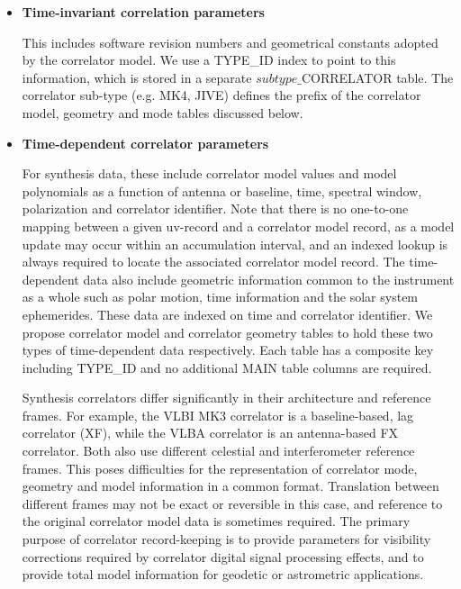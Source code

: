 \documentclass{article}
\begin{document}
\begin{itemize}
\item{{\bf Time-invariant correlation parameters}

This includes software revision numbers and geometrical constants
adopted by the correlator model. We use a TYPE\_ID index to point to
this information, which is stored in a separate $subtype\_$CORRELATOR
table.  The correlator sub-type (e.g. MK4, JIVE) defines the prefix of
the correlator model, geometry and mode tables discussed below.  }

\item{{\bf Time-dependent correlator parameters}

For synthesis data, these include correlator model values and model
polynomials as a function of antenna or baseline, time, spectral
window, polarization and correlator identifier. Note that there is no
one-to-one mapping between a given uv-record and a correlator model
record, as a model update may occur within an accumulation
interval, and an indexed lookup is always required to locate the
associated correlator model record. The time-dependent data also
include geometric information common to the instrument as a whole such as
polar motion, time information and the solar system ephemerides. These
data are indexed on time and correlator identifier. We propose 
correlator model and correlator geometry tables to hold these two
types of time-dependent data respectively. Each table has a composite
key including TYPE\_ID and no additional MAIN table columns are
required.

Synthesis correlators differ significantly in their architecture and
reference frames. For example, the VLBI MK3 correlator is a
baseline-based, lag correlator (XF), while the VLBA correlator is an
antenna-based FX correlator. Both also use different celestial and
interferometer reference frames. This poses difficulties for the
representation of correlator mode, geometry and model information in a
common format. Translation between different frames may not be exact
or reversible in this case, and reference to the original correlator
model data is sometimes required. The primary purpose of correlator
record-keeping is to provide parameters for visibility corrections
required by correlator digital signal processing effects, and to
provide total model information for geodetic or astrometric
applications.

}
\end{itemize}
\end{document}
